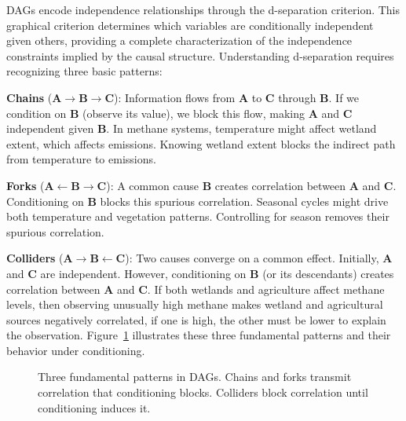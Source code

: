 DAGs encode independence relationships through the d-separation criterion. This graphical criterion determines which variables are conditionally independent given others, providing a complete characterization of the independence constraints implied by the causal structure. Understanding d-separation requires recognizing three basic patterns:

\textbf{Chains} ($\mathbf{A} \rightarrow \mathbf{B} \rightarrow \mathbf{C}$): Information flows from $\mathbf{A}$ to $\mathbf{C}$ through $\mathbf{B}$. If we condition on $\mathbf{B}$ (observe its value), we block this flow, making $\mathbf{A}$ and $\mathbf{C}$ independent given $\mathbf{B}$. In methane systems, temperature might affect wetland extent, which affects emissions. Knowing wetland extent blocks the indirect path from temperature to emissions.

\textbf{Forks} ($\mathbf{A} \leftarrow \mathbf{B} \rightarrow \mathbf{C}$): A common cause $\mathbf{B}$ creates correlation between $\mathbf{A}$ and $\mathbf{C}$. Conditioning on $\mathbf{B}$ blocks this spurious correlation. Seasonal cycles might drive both temperature and vegetation patterns. Controlling for season removes their spurious correlation.

\textbf{Colliders} ($\mathbf{A} \rightarrow \mathbf{B} \leftarrow \mathbf{C}$): Two causes converge on a common effect. Initially, $\mathbf{A}$ and $\mathbf{C}$ are independent. However, conditioning on $\mathbf{B}$ (or its descendants) creates correlation between $\mathbf{A}$ and $\mathbf{C}$. If both wetlands and agriculture affect methane levels, then observing unusually high methane makes wetland and agricultural sources negatively correlated, if one is high, the other must be lower to explain the observation. Figure~\ref{fig:dag_patterns} illustrates these three fundamental patterns and their behavior under conditioning.

\begin{figure}[h!]
	\centering
	\caption[Three fundamental patterns in DAGs]{Three fundamental patterns in DAGs. Chains and forks transmit correlation that conditioning blocks. Colliders block correlation until conditioning induces it.}
	\label{fig:dag_patterns}
\end{figure}

